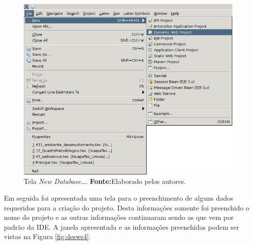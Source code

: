 	
	\begin{figure}[h!]
		\centerline{\includegraphics[scale=0.8]{./imagens/2_q_metodologico/4_procedimentos_resultados/43_webservice/432_desenvolvimento/desws3.png}}
		\caption[Tela \textit{New Database\ldots}]{Tela \textit{New Database\ldots}.
			\textbf{Fonte:}Elaborado pelos autores.}
		\label{fig:desws3}
	\end{figure}
	
	\pagebreak
	
 	\par Em seguida foi apresentada uma tela para o preenchimento de alguns dados
 requeridos para a criação do projeto. Desta informações somente foi preenchido
 o nome do projeto e as outras informações continuaram sendo as que vem por
 padrão da IDE. A janela apresentada e as informações preenchidas podem ser
 vistas na Figura \ref{fig:desws4}.

